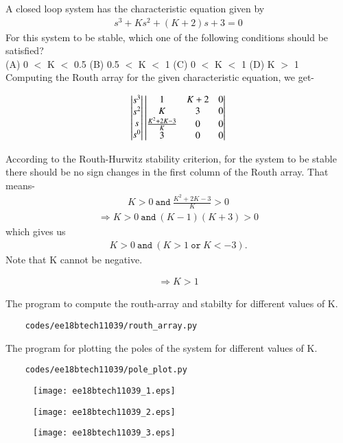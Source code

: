 A closed loop system has the characteristic equation given by \begin{align} s^3+Ks^2+(K+2)s+3 = 0 \end{align}For this system to be stable, which one of the following conditions should be satisfied? \\
(A) 0 \(<\) K \(<\) 0.5 
(B) 0.5 \(<\) K \(<\) 1 
(C) 0 \(<\) K \(<\) 1 
(D) K \(>\) 1 \\

\solution
Computing the Routh array for the given characteristic equation, we get-

\begin{align}
    \begin{vmatrix}s^3 \\ s^2 \\ s \\ s^0\end{vmatrix} 
    \begin{vmatrix}1 & K+2 & 0 \\ K & 3 & 0 \\ \frac{K^2+2K-3}{K} & 0 & 0 \\ 3 & 0 & 0\end{vmatrix}
\end{align}

According to the Routh-Hurwitz stability criterion, for the system to be stable there should be no sign changes in the first column of the Routh array. That means-
\begin{align}
    K > 0 \ \texttt{and} \ \frac{K^2+2K-3}{K} > 0 
\end{align}
\begin{align}
\Rightarrow K > 0 \ \texttt{and} \ (K-1)(K+3) > 0 
\end{align}
which gives us 
\begin{align}
    K > 0 \ \texttt{and} \ (K > 1 \ \texttt{or} \ K < -3).
\end{align}
Note that K cannot be negative.

\begin{align}
\Rightarrow K > 1 
\end{align}

The program to compute the routh-array and stabilty for different values of K.
\begin{lstlisting}
    codes/ee18btech11039/routh_array.py
\end{lstlisting}

The program for plotting the poles of the system for different values of K.
\begin{lstlisting}
    codes/ee18btech11039/pole_plot.py
\end{lstlisting}

\begin{figure}[!ht]
\begin{center}
\texttt{[image: ee18btech11039\_1.eps]}
\end{center}
\label{fig:ee18btech11039}
\end{figure}

\begin{figure}[!ht]
\begin{center}
\texttt{[image: ee18btech11039\_2.eps]}
\end{center}
\label{fig:ee18btech11039}
\end{figure}

\begin{figure}[!ht]
\begin{center}
\texttt{[image: ee18btech11039\_3.eps]}
\end{center}
\label{fig:ee18btech11039}
\end{figure}



